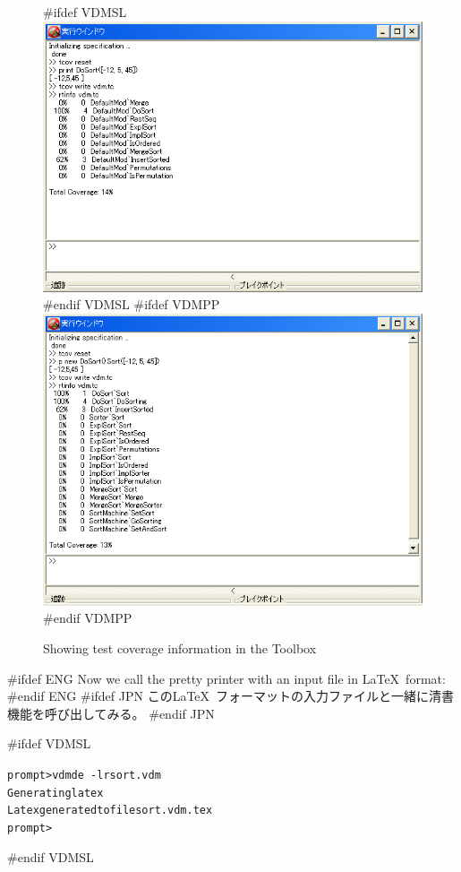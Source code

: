 \documentclass[\pformat,12pt]{article}
\newcommand{\Toolbox}{Toolbox}
\newcommand{\vdmde}{vdmde}
\newcommand{\Toolbox}{Toolbox}
\newcommand{\vdmde}{vppde}
\begin{document}
\begin{figure}[tbh]
\begin{center}
#ifdef VDMSL
\includegraphics[width=\textwidth]{guitcov-sl.png}
#endif VDMSL
#ifdef VDMPP
\includegraphics[width=\textwidth]{guitcov-pp.png}
#endif VDMPP
\caption{Showing test coverage information in the \protect\Toolbox}
\label{fig:rtinfo}
\end{center}
\end{figure}

#ifdef ENG
Now we call the pretty printer with an input file in \LaTeX\ format:
#endif ENG
#ifdef JPN
この\LaTeX\ フォーマットの入力ファイルと一緒に清書機能を呼び出してみる。
#endif JPN

#ifdef VDMSL
\begin{alltt}
prompt> \vdmde\ -lr sort.vdm 
Generating latex
Latex generated to file sort.vdm.tex
prompt>
\end{alltt}
#endif VDMSL
\end{document}
